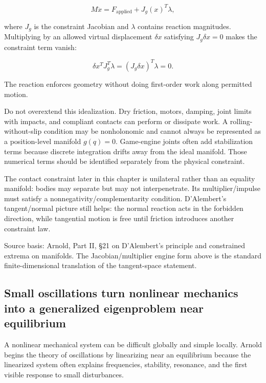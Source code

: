 \[
M\ddot x
=
F_{\mathrm{applied}}
+
J_g(x)^T\lambda,
\]

where \(J_g\) is the constraint Jacobian and \(\lambda\) contains reaction magnitudes. Multiplying by an allowed virtual displacement \(\delta x\) satisfying \(J_g\delta x=0\) makes the constraint term vanish:

\[
\delta x^T J_g^T\lambda
=
(J_g\delta x)^T\lambda
=
0.
\]

The reaction enforces geometry without doing first-order work along permitted motion.

Do not overextend this idealization. Dry friction, motors, damping, joint limits with impacts, and compliant contacts can perform or dissipate work. A rolling-without-slip condition may be nonholonomic and cannot always be represented as a position-level manifold \(g(q)=0\). Game-engine joints often add stabilization terms because discrete integration drifts away from the ideal manifold. Those numerical terms should be identified separately from the physical constraint.

The contact constraint later in this chapter is unilateral rather than an equality manifold: bodies may separate but may not interpenetrate. Its multiplier/impulse must satisfy a nonnegativity/complementarity condition. D'Alembert's tangent/normal picture still helps: the normal reaction acts in the forbidden direction, while tangential motion is free until friction introduces another constraint law.

Source basis: Arnold, Part II, §21 on D'Alembert's principle and constrained extrema on manifolds. The Jacobian/multiplier engine form above is the standard finite-dimensional translation of the tangent-space statement.

\subsection{Small oscillations turn nonlinear mechanics into a generalized eigenproblem near equilibrium}\label{02-foundations-ii-ch039-small-oscillations-turn-nonlinear-mechanics-into-a-generalized-eigenproblem-near-equilibrium}

\hypertarget{02-foundations-ii-ch039-small-oscillations-turn-nonlinear-mechanics-into-a-generalized-eigenproblem-near-equilibrium}{}

A nonlinear mechanical system can be difficult globally and simple locally. Arnold begins the theory of oscillations by linearizing near an equilibrium because the linearized system often explains frequencies, stability, resonance, and the first visible response to small disturbances.


